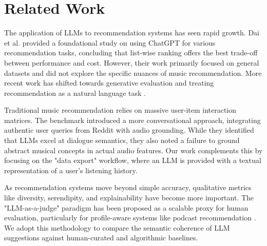 \section{Related Work}

The application of LLMs to recommendation systems has seen rapid growth. Dai et al. \cite{dai2023uncovering} provided a foundational study on using ChatGPT for various recommendation tasks, concluding that list-wise ranking offers the best trade-off between performance and cost. However, their work primarily focused on general datasets and did not explore the specific nuances of music recommendation. More recent work has shifted towards generative evaluation and treating recommendation as a natural language task \cite{anonymous2025llmrec}.

Traditional music recommendation relies on massive user-item interaction matrices. The \musicrs benchmark \cite{surana2025musicrs} introduced a more conversational approach, integrating authentic user queries from Reddit with audio grounding. While they identified that LLMs excel at dialogue semantics, they also noted a failure to ground abstract musical concepts in actual audio features. Our work complements this by focusing on the "data export" workflow, where an LLM is provided with a textual representation of a user's listening history.

As recommendation systems move beyond simple accuracy, qualitative metrics like diversity, serendipity, and explainability have become more important. The "LLM-as-a-judge" paradigm has been proposed as a scalable proxy for human evaluation, particularly for profile-aware systems like podcast recommendation \cite{anonymous2025profilejudge}. We adopt this methodology to compare the semantic coherence of LLM suggestions against human-curated and algorithmic baselines.
